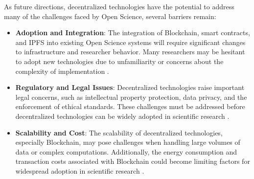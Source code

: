 \documentclass[final]{rc-book-2.14}
\begin{document}
As future directions, decentralized technologies have the potential to address many of the challenges faced by Open Science, several barriers remain:
\begin{itemize}
    \item \textbf{Adoption and Integration}: The integration of Blockchain, smart contracts, and IPFS into existing Open Science systems will require significant changes to infrastructure and researcher behavior. Many researchers may be hesitant to adopt new technologies due to unfamiliarity or concerns about the complexity of implementation \cite{Leonelli2016}.
    \item \textbf{Regulatory and Legal Issues}: Decentralized technologies raise important legal concerns, such as intellectual property protection, data privacy, and the enforcement of ethical standards. These challenges must be addressed before decentralized technologies can be widely adopted in scientific research \cite{Borgman2012}.
    \item \textbf{Scalability and Cost}: The scalability of decentralized technologies, especially Blockchain, may pose challenges when handling large volumes of data or complex computations. Additionally, the energy consumption and transaction costs associated with Blockchain could become limiting factors for widespread adoption in scientific research \cite{Boulton2015}.
\end{itemize}



\backmatter



\end{document}
